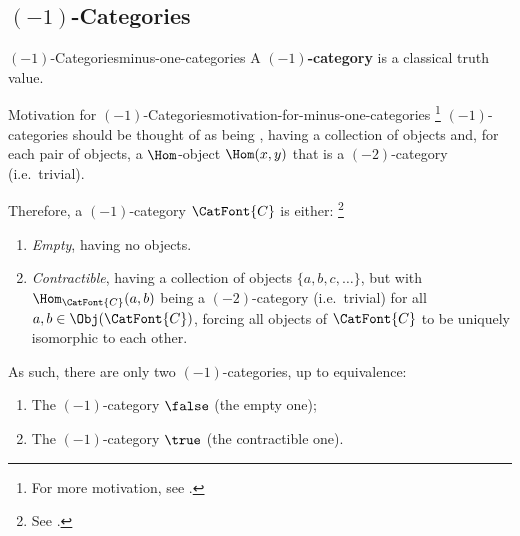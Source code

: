 \subsection{\texorpdfstring{$(-1)$}{(-1)}-Categories}\label{subsection-minus-one-categories}
\begin{definition}{$(-1)$-Categories}{minus-one-categories}%
    A \textbf{$(-1)$-category} is a classical truth value.%
\end{definition}
\begin{remark}{Motivation for $(-1)$-Categories}{motivation-for-minus-one-categories}%
    \footnote{%
        For more motivation, see \cite[p.~13]{lectures-on-n-categories-and-cohomology}.
    }%
    $(-1)$-categories should be thought of as being , having a collection of objects and, for each pair of objects, a $\Hom$-object $\Hom(x,y)$ that is a $(-2)$-category (i.e.\ trivial).%

    \indent Therefore, a $(-1)$-category $\CatFont{C}$ is either:%
    \footnote{%
        See \cite[pp.~33--34]{lectures-on-n-categories-and-cohomology}.
        \par\vspace*{\TCBBoxCorrection}
    }%
    \begin{enumerate}
        \item\label{motivation-for-minus-one-categories-empty}\emph{Empty}, having no objects.
        \item\label{motivation-for-minus-one-categories-contractible}\emph{Contractible}, having a collection of objects $\{a,b,c,\ldots\}$, but with $\Hom_{\CatFont{C}}(a,b)$ being a $(-2)$-category (i.e.\ trivial) for all $a,b\in\Obj(\CatFont{C})$, forcing all objects of $\CatFont{C}$ to be uniquely isomorphic to each other.
    \end{enumerate}
    As such, there are only two $(-1)$-categories, up to equivalence:
    \begin{enumerate}
        \item\label{motivation-for-minus-one-categories-false}The $(-1)$-category $\false$ (the empty one);
        \item\label{motivation-for-minus-one-categories-true}The $(-1)$-category $\true$  (the contractible one).%
    \end{enumerate}
\end{remark}
